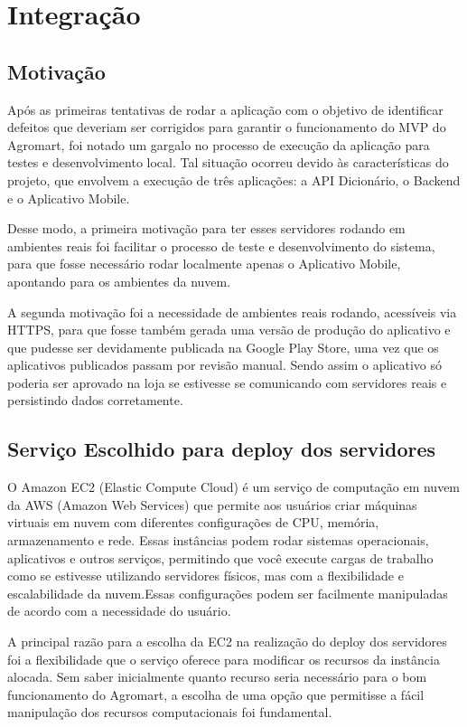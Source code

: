 \chapter[Integração]{Integração}

\section{Motivação}
Após as primeiras tentativas de rodar a aplicação com o objetivo de identificar defeitos que deveriam ser corrigidos para garantir o funcionamento do MVP do Agromart, foi notado um gargalo no processo de execução da aplicação para testes e desenvolvimento local. Tal situação ocorreu devido às características do projeto, que envolvem a execução de três aplicações: a API Dicionário, o Backend e o Aplicativo Mobile.

Desse modo, a primeira motivação para ter esses servidores rodando em ambientes reais foi facilitar o processo de teste e desenvolvimento do sistema, para que fosse necessário rodar localmente apenas o Aplicativo Mobile, apontando para os ambientes da nuvem.

A segunda motivação foi a necessidade de ambientes reais rodando, acessíveis via HTTPS, para que fosse também gerada uma versão de produção do aplicativo e que pudesse ser devidamente publicada na Google Play Store, uma vez que os aplicativos publicados passam por revisão manual. Sendo assim o aplicativo só poderia ser aprovado na loja se estivesse se comunicando com servidores reais e persistindo dados corretamente.

\section{Serviço Escolhido para deploy dos servidores}
O Amazon EC2 (Elastic Compute Cloud) é um serviço de computação em nuvem da AWS (Amazon Web Services) que permite aos usuários criar máquinas virtuais em nuvem com diferentes configurações de CPU, memória, armazenamento e rede. Essas instâncias podem rodar sistemas operacionais, aplicativos e outros serviços, permitindo que você execute cargas de trabalho como se estivesse utilizando servidores físicos, mas com a flexibilidade e escalabilidade da nuvem.Essas configurações podem ser facilmente manipuladas de acordo com a necessidade do usuário.

A principal razão para a escolha da EC2 na realização do deploy dos servidores foi a flexibilidade que o serviço oferece para modificar os recursos da instância alocada. Sem saber inicialmente quanto recurso seria necessário para o bom funcionamento do Agromart, a escolha de uma opção que permitisse a fácil manipulação dos recursos computacionais foi fundamental.

